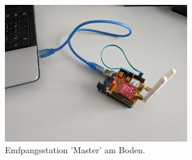 \documentclass[a4paper,11pt,DIV=calc,tablecaptionabove,headinclude,twoside]{article}
\begin{document}
\begin{figure}[t]
	\centering
	\includegraphics[width=0.7\textwidth]{Master.jpg}
	\captionsetup{width=11cm}
	\caption{Emfpangsstation 'Master' am Boden.}
	\label{Master}
\end{figure}
\end{document}
